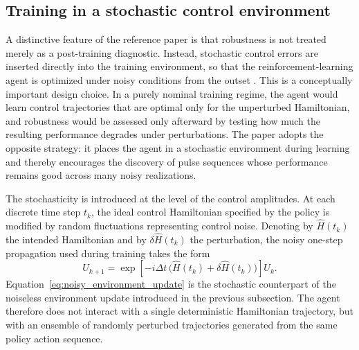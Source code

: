 \subsection{Training in a stochastic control environment}
\label{subsec:stochastic_training_environment}

A distinctive feature of the reference paper is that robustness is not treated merely as a post-training diagnostic. Instead, stochastic control errors are inserted directly into the training environment, so that the reinforcement-learning agent is optimized under noisy conditions from the outset \cite{Niu2019}. This is a conceptually important design choice. In a purely nominal training regime, the agent would learn control trajectories that are optimal only for the unperturbed Hamiltonian, and robustness would be assessed only afterward by testing how much the resulting performance degrades under perturbations. The paper adopts the opposite strategy: it places the agent in a stochastic environment during learning and thereby encourages the discovery of pulse sequences whose performance remains good across many noisy realizations.

The stochasticity is introduced at the level of the control amplitudes. At each discrete time step \(t_k\), the ideal control Hamiltonian specified by the policy is modified by random fluctuations representing control noise. Denoting by \(\hat{H}(t_k)\) the intended Hamiltonian and by \(\delta \hat{H}(t_k)\) the perturbation, the noisy one-step propagation used during training takes the form
\begin{equation}
U_{k+1}
=
\exp\!\left[
-i\Delta t\,
\bigl(
\hat{H}(t_k)+\delta \hat{H}(t_k)
\bigr)
\right]
U_k.
\label{eq:noisy_environment_update}
\end{equation}
Equation~\eqref{eq:noisy_environment_update} is the stochastic counterpart of the noiseless environment update introduced in the previous subsection. The agent therefore does not interact with a single deterministic Hamiltonian trajectory, but with an ensemble of randomly perturbed trajectories generated from the same policy action sequence.

